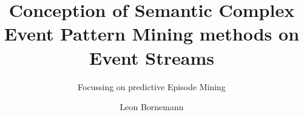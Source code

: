 \title{Conception of Semantic Complex Event Pattern Mining methods on Event Streams}

\subtitle{Focussing on predictive Episode Mining}

\author{Leon Bornemann}








\renewcommand{\submissiontext}{This thesis is submitted for the degree of}




\subject{Data Stream Mining} 
